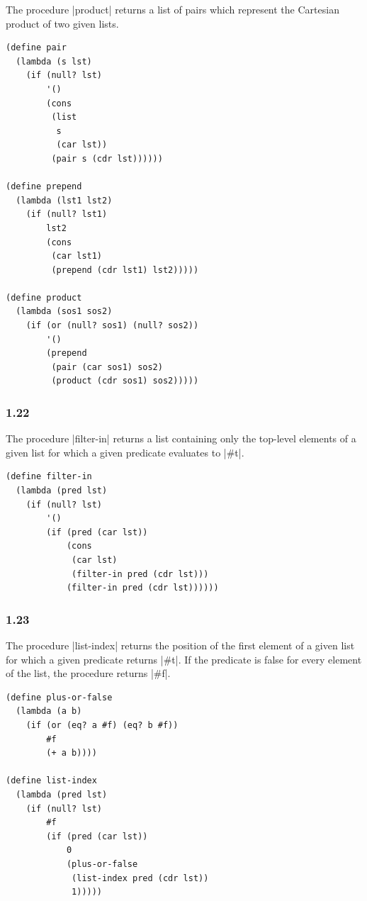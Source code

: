 \documentclass[a4paper]{article}
\begin{document}
The procedure |product| returns a list of pairs which represent the Cartesian product of two given lists.

\begin{lstlisting}
(define pair
  (lambda (s lst)
    (if (null? lst)
        '()
        (cons
         (list
          s
          (car lst))
         (pair s (cdr lst))))))

(define prepend
  (lambda (lst1 lst2)
    (if (null? lst1)
        lst2
        (cons
         (car lst1)
         (prepend (cdr lst1) lst2)))))

(define product
  (lambda (sos1 sos2)
    (if (or (null? sos1) (null? sos2))
        '()
        (prepend
         (pair (car sos1) sos2)
         (product (cdr sos1) sos2)))))
\end{lstlisting}

\subsubsection*{1.22}

The procedure |filter-in| returns a list containing only the top-level elements of a given list for which a given predicate evaluates to |#t|.

\begin{lstlisting}
(define filter-in
  (lambda (pred lst)
    (if (null? lst)
        '()
        (if (pred (car lst))
            (cons
             (car lst)
             (filter-in pred (cdr lst)))
            (filter-in pred (cdr lst))))))
\end{lstlisting}

\subsubsection*{1.23}

The procedure |list-index| returns the position of the first element of a given list for which a given predicate returns |#t|. If the predicate is false for every element of the list, the procedure returns |#f|.

\begin{lstlisting}
(define plus-or-false
  (lambda (a b)
    (if (or (eq? a #f) (eq? b #f))
        #f
        (+ a b))))

(define list-index
  (lambda (pred lst)
    (if (null? lst)
        #f
        (if (pred (car lst))
            0
            (plus-or-false
             (list-index pred (cdr lst))
             1)))))
\end{lstlisting}
\end{document}
